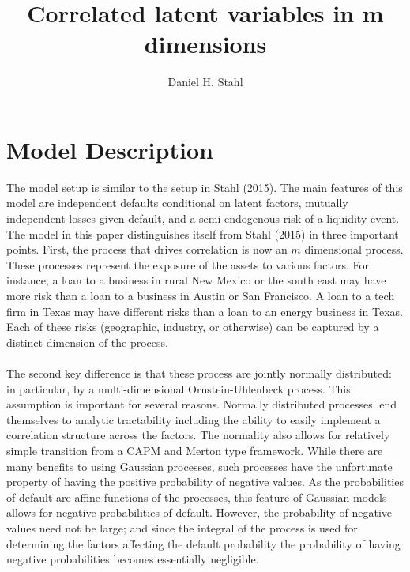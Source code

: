 \documentclass[12pt]{article}
\theoremstyle{definition}
\begin{document}
\title{Correlated latent variables in m dimensions}
\date{}
\author{Daniel H. Stahl}
\maketitle

\newpage
 
\section{Model Description}
The model setup is similar to the setup in Stahl (2015).  The main features of this model are independent defaults conditional on latent factors, mutually independent losses given default, and a semi-endogenous risk of a liquidity event.  The model in this paper distinguishes itself from Stahl (2015) in three important points.  First, the process that drives correlation is now an \(m\) dimensional process.  These processes represent the exposure of the assets to various factors.  For instance, a loan to a business in rural New Mexico or the south east may have more risk than a loan to a business in Austin or San Francisco.  A loan to a tech firm in Texas may have different risks than a loan to an energy business in Texas.  Each of these risks (geographic, industry, or otherwise) can be captured by a distinct dimension of the process.  
\\
\\
The second key difference is that these process are jointly normally distributed: in particular, by a multi-dimensional Ornstein-Uhlenbeck process.  This assumption is important for several reasons.  Normally distributed processes lend themselves to analytic tractability including the ability to easily implement a correlation structure across the factors.  The normality also allows for relatively simple transition from a CAPM and Merton type framework.  While there are many benefits to using Gaussian processes, such processes have the unfortunate property of having the positive probability of negative values.  As the probabilities of default are affine functions of the processes, this feature of Gaussian models allows for negative probabilities of default.  However, the probability of negative values need not be large; and since the integral of the process is used for determining the factors affecting the default probability the probability of having negative probabilities becomes essentially negligible.  
\\
\\
\end{document}
